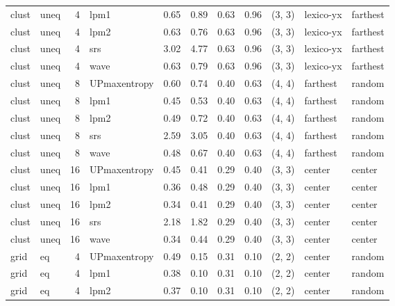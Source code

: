\begin{tabular}{llrlrrrrlll}
 clust &  uneq &  4 &         lpm1 &  0.65 &     0.89 &   0.63 &       0.96 & (3, 3) &   lexico-yx &   farthest \\
 clust &  uneq &  4 &         lpm2 &  0.63 &     0.76 &   0.63 &       0.96 & (3, 3) &   lexico-yx &   farthest \\
 clust &  uneq &  4 &          srs &  3.02 &     4.77 &   0.63 &       0.96 & (3, 3) &   lexico-yx &   farthest \\
 clust &  uneq &  4 &         wave &  0.63 &     0.79 &   0.63 &       0.96 & (3, 3) &   lexico-yx &   farthest \\
 clust &  uneq &  8 & UPmaxentropy &  0.60 &     0.74 &   0.40 &       0.63 & (4, 4) &    farthest &     random \\
 clust &  uneq &  8 &         lpm1 &  0.45 &     0.53 &   0.40 &       0.63 & (4, 4) &    farthest &     random \\
 clust &  uneq &  8 &         lpm2 &  0.49 &     0.72 &   0.40 &       0.63 & (4, 4) &    farthest &     random \\
 clust &  uneq &  8 &          srs &  2.59 &     3.05 &   0.40 &       0.63 & (4, 4) &    farthest &     random \\
 clust &  uneq &  8 &         wave &  0.48 &     0.67 &   0.40 &       0.63 & (4, 4) &    farthest &     random \\
 clust &  uneq & 16 & UPmaxentropy &  0.45 &     0.41 &   0.29 &       0.40 & (3, 3) &      center &     center \\
 clust &  uneq & 16 &         lpm1 &  0.36 &     0.48 &   0.29 &       0.40 & (3, 3) &      center &     center \\
 clust &  uneq & 16 &         lpm2 &  0.34 &     0.41 &   0.29 &       0.40 & (3, 3) &      center &     center \\
 clust &  uneq & 16 &          srs &  2.18 &     1.82 &   0.29 &       0.40 & (3, 3) &      center &     center \\
 clust &  uneq & 16 &         wave &  0.34 &     0.44 &   0.29 &       0.40 & (3, 3) &      center &     center \\
  grid &    eq &  4 & UPmaxentropy &  0.49 &     0.15 &   0.31 &       0.10 & (2, 2) &      center &     random \\
  grid &    eq &  4 &         lpm1 &  0.38 &     0.10 &   0.31 &       0.10 & (2, 2) &      center &     random \\
  grid &    eq &  4 &         lpm2 &  0.37 &     0.10 &   0.31 &       0.10 & (2, 2) &      center &     random \\

\end{tabular}
